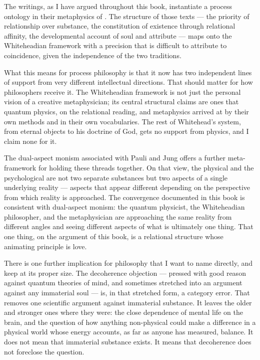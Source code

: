 The \bahai writings, as I have argued throughout this book, instantiate a process
ontology in their metaphysics of \mahabbat \citep{PUP,SAQ,SummonsLordHosts}.  The structure
of those texts --- the priority of relationship over substance, the constitution
of existence through relational affinity, the developmental account of soul and
attribute --- maps onto the Whiteheadian framework with a precision that is
difficult to attribute to coincidence, given the independence of the two
traditions.

What this means for process philosophy is that it now has two independent
lines of support from very different intellectual directions.  That should matter
for how philosophers receive it.  The Whiteheadian framework is not just the
personal vision of a creative metaphysician; its central structural claims are
ones that quantum physics, on the relational reading, and \bahai metaphysics
arrived at by their own methods and in their own vocabularies.  The rest of
Whitehead's system, from eternal objects to his doctrine of God, gets no
support from physics, and I claim none for it.

The dual-aspect monism associated with Pauli and Jung offers a further
meta-framework for holding these threads together.  On that view, the physical
and the psychological are not two separate substances but two aspects of a single
underlying reality --- aspects that appear different depending on the perspective
from which reality is approached.  The convergence documented in this book is
consistent with dual-aspect monism: the quantum physicist, the Whiteheadian
philosopher, and the \bahai metaphysician are approaching the same reality from
different angles and seeing different aspects of what is ultimately one thing.
That one thing, on the argument of this book, is a relational structure whose
animating principle is love.

There is one further implication for philosophy that I want to name directly,
and keep at its proper size.  The decoherence objection --- pressed with good
reason against quantum theories of mind, and sometimes stretched into an
argument against any immaterial soul --- is, in that stretched form, a
category error.  That removes one scientific argument against immaterial
substance.  It leaves the older and stronger ones where they were: the close
dependence of mental life on the brain, and the question of how anything
non-physical could make a difference in a physical world whose energy
accounts, as far as anyone has measured, balance.  It does not mean that
immaterial substance exists.  It means that decoherence does not foreclose the
question.

